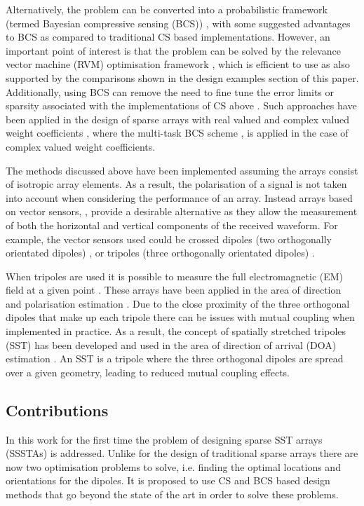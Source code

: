 \documentclass[10pt,final]{IEEEtran}
\begin{document}
Alternatively, the problem can be converted into a
probabilistic framework (termed Bayesian compressive sensing (BCS)) \cite{Ji08}, with some suggested advantages to BCS as compared to traditional CS based implementations.
However, an important point of interest is that the problem can be solved by the relevance vector machine
(RVM) optimisation framework \cite{Tipping01}, which is efficient to use as also supported by the
comparisons shown in the design examples section of this paper.  Additionally, using BCS can remove the
need to fine tune the error limits or sparsity associated with the implementations of CS above \cite{Carmi10}.
  Such approaches have been applied in the design of sparse
arrays with real valued and complex valued weight coefficients
\cite{Oliveri11a,Oliveri12,Viani13}, where the multi-task BCS scheme \cite{Ji09}, is applied in the case of
 complex valued weight coefficients.

The methods discussed above have been implemented assuming the arrays consist of isotropic array elements.
As a result, the polarisation of a
signal is not taken into account when considering the performance of
an array. Instead arrays based on vector sensors, \cite{Hawes15b,Zhong14}, provide a desirable alternative as they
allow the measurement of both the horizontal and vertical components of the received waveform. For example,
the vector sensors used could be crossed dipoles (two orthogonally orientated dipoles)
\cite{Hawes15b,Compton81,Li91,WangK15}, or tripoles (three orthogonally orientated dipoles) \cite{Compton81b,Liu13a}.

When tripoles are used it is possible to measure the full electromagnetic (EM) field at a given
point \cite{Liu13a}.  These arrays have been applied in the area of direction and polarisation estimation
\cite{Compton81b}.  Due to the close proximity of the three orthogonal dipoles that make up each
tripole there can be issues with mutual coupling when implemented in practice.  As a result, the concept of
spatially stretched tripoles (SST) has been developed and used in the area of direction of arrival (DOA)
estimation \cite{Liu13a}.  An SST is a tripole where the three orthogonal dipoles are spread over a
given geometry, leading to reduced mutual coupling effects.

\subsection{Contributions}

In this work for the first time the problem of designing sparse SST arrays (SSSTAs) is addressed.
Unlike for the design of traditional sparse arrays there are now two optimisation problems to solve,
i.e. finding the optimal locations and orientations for the dipoles.  It is proposed to use CS and BCS
based design methods that go beyond the state of the art in order to solve these problems.
\end{document}
